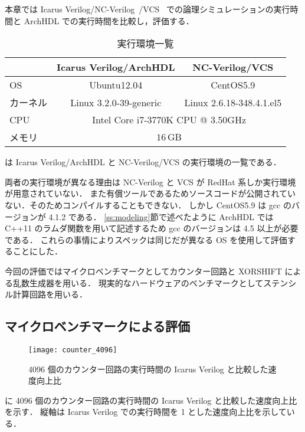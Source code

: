 本章では Icarus Verilog/NC-Verilog~\cite{ncverilog}/VCS~\cite{vcs}
での論理シミュレーションの実行時間と ArchHDL
での実行時間を比較し，評価する．

\begin{table}[t]
 \caption{実行環境一覧}
 \label{table:exec_env}
 \begin{center}
  \begin{tabular}{lcc} \toprule
         &  Icarus Verilog/ArchHDL  &  NC-Verilog/VCS   \\ \midrule
  OS     &  Ubuntu12.04             &  CentOS5.9        \\
  カーネル &  Linux 3.2.0-39-generic  &  Linux 2.6.18-348.4.1.el5   \\
  CPU    &  \multicolumn{2}{c}{Intel Core i7-3770K CPU @ 3.50GHz}   \\
  メモリ  &  \multicolumn{2}{c}{$16\,\mathrm{GB}$}  \\ \bottomrule
  \end{tabular}
 \end{center}
\end{table}

 は Icarus Verilog/ArchHDL と NC-Verilog/VCS
の実行環境の一覧である．

両者の実行環境が異なる理由は NC-Verilog と VCS が RedHat 系しか実行環境が用意されていない．
また有償ツールであるためソースコードが公開されていない．そのためコンパイルすることもできない．
しかし CentOS5.9 は gcc のバージョンが 4.1.2 である．
\ref{ss:modeling}節で述べたように ArchHDL では C++11 のラムダ関数を用いて記述するため gcc のバージョンは 4.5 以上が必要である．
これらの事情によりスペックは同じだが異なる OS を使用して評価することにした．

今回の評価ではマイクロベンチマークとしてカウンター回路と XORSHIFT による乱数生成器を用いる．
現実的なハードウェアのベンチマークとしてステンシル計算回路を用いる．


\subsection{マイクロベンチマークによる評価}

\begin{figure}[t]
 \centering
 \texttt{[image: counter\_4096]}
 \caption{4096 個のカウンター回路の実行時間の Icarus Verilog と比較した速度向上比}
 \label{fig:counter4096}
\end{figure}

 に 4096 個のカウンター回路の実行時間の Icarus Verilog と比較した速度向上比を示す．
縦軸は Icarus Verilog での実行時間を 1 とした速度向上比を示している．

